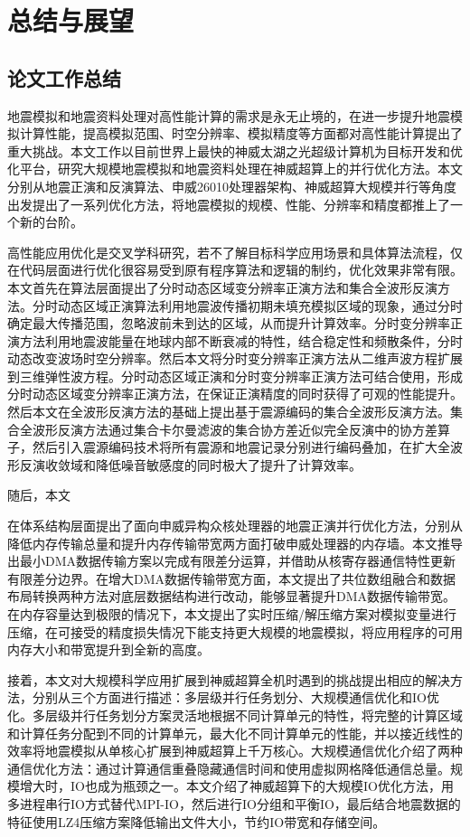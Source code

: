 \chapter{总结与展望} %
\label{ch:总结与展望}

\section{论文工作总结}

地震模拟和地震资料处理对高性能计算的需求是永无止境的，在进一步提升地震模拟计算性能，提高模拟范围、时空分辨率、模拟精度等方面都对高性能计算提出了重大挑战。本文工作以目前世界上最快的神威太湖之光超级计算机为目标开发和优化平台，研究大规模地震模拟和地震资料处理在神威超算上的并行优化方法。本文分别从地震正演和反演算法、申威26010处理器架构、神威超算大规模并行等角度出发提出了一系列优化方法，将地震模拟的规模、性能、分辨率和精度都推上了一个新的台阶。

高性能应用优化是交叉学科研究，若不了解目标科学应用场景和具体算法流程，仅在代码层面进行优化很容易受到原有程序算法和逻辑的制约，优化效果非常有限。本文首先在算法层面提出了分时动态区域变分辨率正演方法和集合全波形反演方法。分时动态区域正演算法利用地震波传播初期未填充模拟区域的现象，通过分时确定最大传播范围，忽略波前未到达的区域，从而提升计算效率。分时变分辨率正演方法利用地震波能量在地球内部不断衰减的特性，结合稳定性和频散条件，分时动态改变波场时空分辨率。然后本文将分时变分辨率正演方法从二维声波方程扩展到三维弹性波方程。分时动态区域正演和分时变分辨率正演方法可结合使用，形成分时动态区域变分辨率正演方法，在保证正演精度的同时获得了可观的性能提升。然后本文在全波形反演方法的基础上提出基于震源编码的集合全波形反演方法。集合全波形反演方法通过集合卡尔曼滤波的集合协方差近似完全反演中的协方差算子，然后引入震源编码技术将所有震源和地震记录分别进行编码叠加，在扩大全波形反演收敛域和降低噪音敏感度的同时极大了提升了计算效率。

随后，本文

在体系结构层面提出了面向申威异构众核处理器的地震正演并行优化方法，分别从降低内存传输总量和提升内存传输带宽两方面打破申威处理器的内存墙。本文推导出最小DMA数据传输方案以完成有限差分运算，并借助从核寄存器通信特性更新有限差分边界。在增大DMA数据传输带宽方面，本文提出了共位数组融合和数据布局转换两种方法对底层数据结构进行改动，能够显著提升DMA数据传输带宽。在内存容量达到极限的情况下，本文提出了实时压缩/解压缩方案对模拟变量进行压缩，在可接受的精度损失情况下能支持更大规模的地震模拟，将应用程序的可用内存大小和带宽提升到全新的高度。

接着，本文对大规模科学应用扩展到神威超算全机时遇到的挑战提出相应的解决方法，分别从三个方面进行描述：多层级并行任务划分、大规模通信优化和IO优化。多层级并行任务划分方案灵活地根据不同计算单元的特性，将完整的计算区域和计算任务分配到不同的计算单元，最大化不同计算单元的性能，并以接近线性的效率将地震模拟从单核心扩展到神威超算上千万核心。大规模通信优化介绍了两种通信优化方法：通过计算通信重叠隐藏通信时间和使用虚拟网格降低通信总量。规模增大时，IO也成为瓶颈之一。本文介绍了神威超算下的大规模IO优化方法，用多进程串行IO方式替代MPI-IO，然后进行IO分组和平衡IO，最后结合地震数据的特征使用LZ4压缩方案降低输出文件大小，节约IO带宽和存储空间。


